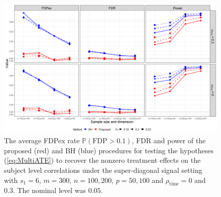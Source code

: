 \documentclass[12pt]{article}
\theoremstyle{definition}
\begin{document}
\begin{figure}[t]
	\centering
	\includegraphics[width=\linewidth]{plot-correlation-off.png}
	\caption{The average FDPex rate $\mathbb{P}(\mbox{FDP} > 0.1)$, FDR and power of the proposed (red) and BH (blue) procedures for testing the hypotheses (\ref{eq:MultiATE}) to recover the nonzero treatment effects on the subject level correlations under the super-diagonal signal setting with $s_1 = 6$, $m = 300$, $n = 100, 200$, $p = 50, 100$ and $\rho_{\mathrm{\scriptstyle time}} = 0$ and $0.3$. The nominal level was $0.05$.}
	\label{simulation2}
\end{figure}
\end{document}
